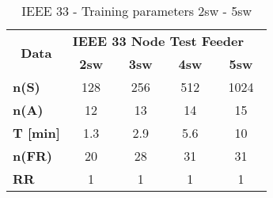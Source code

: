 \begin{table}
    \centering
    \caption{IEEE 33 - Training parameters 2sw - 5sw}
    \label{ch3:tab:td33}
    \begin{tabular}{lcccc} 
    \hline
    \multicolumn{1}{c}{\multirow{2}{*}{ \textbf{Data} }} & \multicolumn{4}{l}{\textbf{IEEE 33 Node Test Feeder}~ ~ }      \\ 
    \cline{2-5}
    \multicolumn{1}{c}{}                                 & \textbf{2sw}  & \textbf{3sw}  & \textbf{4sw}  & \textbf{5sw}   \\ 
    \hline
     \textbf{n(S)}                                       & 128           & 256           & 512           & 1024           \\
    \textbf{n(A)}                                        & 12            & 13            & 14            & 15             \\
    \textbf{T [min]}                                       & 1.3           & 2.9           & 5.6           & 10             \\
    \textbf{n(FR)}                                       & 20            & 28            & 31            & 31             \\
    \textbf{RR}                                          & 1             & 1             & 1             & 1              \\
    \hline
    \end{tabular}
    \end{table}